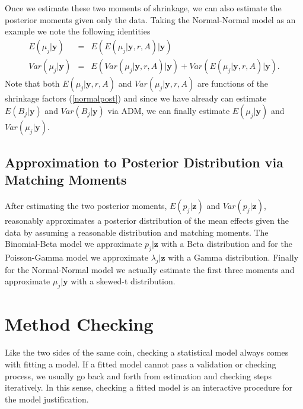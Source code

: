\documentclass[article]{jss}
\begin{document}
Once we estimate these two moments of shrinkage, we can also estimate the posterior moments given only the data. Taking the Normal-Normal model as an example we note the following identities
\begin{eqnarray}
E(\mu_{j}\vert \textbf{y}) & = & E(E(\mu_{j}\vert \textbf{y}, r, A)\vert \textbf{y}) \\ 
Var(\mu_{j}\vert \textbf{y}) & = & E(Var(\mu_{j}\vert \textbf{y}, r, A)\vert \textbf{y})+Var(E(\mu_{j}\vert \textbf{y}, r, A)\vert \textbf{y}).
\end{eqnarray}  
Note that both $E(\mu_{j}\vert \textbf{y}, r, A)$ and $Var(\mu_{j}\vert \textbf{y}, r, A)$ are functions of the shrinkage factors (\ref{normalpost}) and since we have already can estimate $E(B_{j}\vert\textbf{y})$ and $Var(B_{j}\vert\textbf{y})$ via ADM, we can finally estimate $E(\mu_{j}\vert \textbf{y})$ and $Var(\mu_{j}\vert \textbf{y})$.

\subsection[Approximation to Posterior Distribution by Moment Matching]{Approximation to Posterior Distribution via Matching Moments}
After estimating the two posterior moments, $E(p_{j}\vert \textbf{z})$ and $Var(p_{j}\vert \textbf{z})$,  reasonably approximates a posterior distribution of the mean effects given the data by assuming a reasonable distribution and matching moments. The Binomial-Beta model we approximate $p_{j}\vert \textbf{z}$ with a Beta distribution and for the Poisson-Gamma model we approximate $\lambda_{j}\vert \textbf{z}$ with a Gamma distribution. Finally for the Normal-Normal model we actually estimate the first three moments and approximate $\mu_{j}\vert \textbf{y}$ with a skewed-t distribution. %


\section[Method Checking]{Method Checking}
Like the two sides of the same coin, checking a statistical model always comes with fitting a model. If a fitted model cannot pass a validation or checking process, we usually go back and forth from estimation and checking steps iteratively. In this sense, checking a fitted model is an interactive procedure for the model justification.
\end{document}
